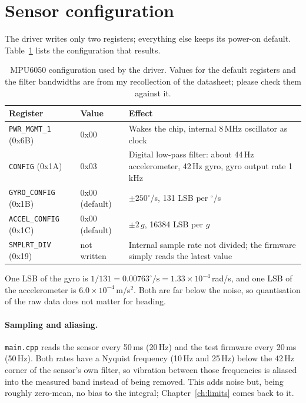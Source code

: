 \documentclass[11pt,a4paper]{report}
\newcommand{\code}[1]{\texttt{#1}}
\begin{document}
\section{Sensor configuration}
The driver writes only two registers; everything else keeps its power-on default. Table~\ref{tab:regs} lists the configuration that results.

\begin{table}[H]
\centering
\caption{MPU6050 configuration used by the driver. Values for the default registers and the filter bandwidths are from my recollection of the datasheet; please check them against it.}\label{tab:regs}
\small
\begin{tabular}{@{}llp{7.4cm}@{}}
\toprule
Register & Value & Effect\\
\midrule
\code{PWR\_MGMT\_1} (0x6B) & 0x00 & Wakes the chip, internal 8\,MHz oscillator as clock\\
\code{CONFIG} (0x1A) & 0x03 & Digital low-pass filter: about 44\,Hz accelerometer, 42\,Hz gyro, gyro output rate 1\,kHz\\
\code{GYRO\_CONFIG} (0x1B) & 0x00 (default) & $\pm250^\circ$/s, 131 LSB per $^\circ$/s\\
\code{ACCEL\_CONFIG} (0x1C) & 0x00 (default) & $\pm2\,g$, 16384 LSB per $g$\\
\code{SMPLRT\_DIV} (0x19) & not written & Internal sample rate not divided; the firmware simply reads the latest value\\
\bottomrule
\end{tabular}
\end{table}

One LSB of the gyro is $1/131=0.00763^\circ/\mathrm s=1.33\times10^{-4}$\,rad/s, and one LSB of the accelerometer is $6.0\times10^{-4}$\,m/s$^2$. Both are far below the noise, so quantisation of the raw data does not matter for heading.

\paragraph{Sampling and aliasing.} \code{main.cpp} reads the sensor every 50\,ms (20\,Hz) and the test firmware every 20\,ms (50\,Hz). Both rates have a Nyquist frequency (10\,Hz and 25\,Hz) below the 42\,Hz corner of the sensor's own filter, so vibration between those frequencies is aliased into the measured band instead of being removed. This adds noise but, being roughly zero-mean, no bias to the integral; Chapter~\ref{ch:limits} comes back to it.
\end{document}
